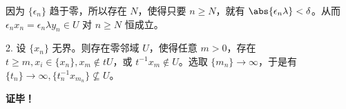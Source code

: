 因为 $\{\epsilon_n\}$ 趋于零，所以存在 $N$，使得只要 $n\geq N$，就有 $\abs{\epsilon_n\lambda}<\delta$。从而 $\epsilon_nx_n=\epsilon_n \lambda y_n\in U$ 对 $n\geq N$ 恒成立。


2. 设 $\{x_n\}$ 无界。则存在零邻域 $U$，使得任意 $m>0$，存在 $t\geq m,x_i\in\{x_n\},x_{m}\notin tU$，或 $t^{-1}x_m\notin U$。选取 $\{m_n\}\rightarrow\infty$，于是有 $\{t_n\}\rightarrow\infty,\{t_n^{-1}x_{m_n}\}\nsubseteq U$。


\textbf{证毕！}











